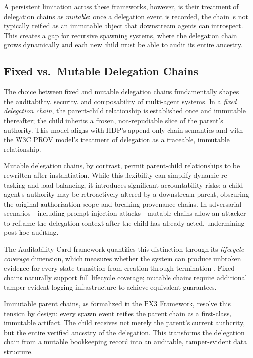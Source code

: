 A persistent limitation across these frameworks, however, is their treatment of delegation chains as \emph{mutable}: once a delegation event is recorded, the chain is not typically reified as an immutable object that downstream agents can introspect. This creates a gap for recursive spawning systems, where the delegation chain grows dynamically and each new child must be able to audit its entire ancestry.

\subsection{Fixed vs.\ Mutable Delegation Chains}

The choice between fixed and mutable delegation chains fundamentally shapes the auditability, security, and composability of multi-agent systems. In a \emph{fixed delegation chain}, the parent-child relationship is established once and immutable thereafter; the child inherits a frozen, non-repudiable slice of the parent's authority. This model aligns with HDP's append-only chain semantics and with the W3C PROV model's treatment of delegation as a traceable, immutable relationship.

Mutable delegation chains, by contrast, permit parent-child relationships to be rewritten after instantiation. While this flexibility can simplify dynamic re-tasking and load balancing, it introduces significant accountability risks: a child agent's authority may be retroactively altered by a downstream parent, obscuring the original authorization scope and breaking provenance chains. In adversarial scenarios---including prompt injection attacks---mutable chains allow an attacker to reframe the delegation context after the child has already acted, undermining post-hoc auditing.

The Auditability Card framework quantifies this distinction through its \emph{lifecycle coverage} dimension, which measures whether the system can produce unbroken evidence for every state transition from creation through termination \cite{agent-auditability}. Fixed chains naturally support full lifecycle coverage; mutable chains require additional tamper-evident logging infrastructure to achieve equivalent guarantees.

Immutable parent chains, as formalized in the BX3 Framework, resolve this tension by design: every spawn event reifies the parent chain as a first-class, immutable artifact. The child receives not merely the parent's current authority, but the entire verified ancestry of the delegation. This transforms the delegation chain from a mutable bookkeeping record into an auditable, tamper-evident data structure.

